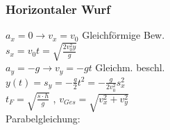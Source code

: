 \begin{multicols}{3}
		\subsubsection{Horizontaler Wurf}
		$a_{x} = 0 \rightarrow{} v_{x} = v_{0}$ Gleichförmige Bew. \\
		$s_{x} = v_{0}t = \sqrt{\frac{2v_{0}^2y}{g}}$ \\
		$a_{y} = -g \rightarrow{} v_{y} = -gt$ Gleichm. beschl.\\
		$y(t) = s_{y} = -\frac{g}{2}t^2 = -\frac{g}{2v_{0}^2}s_{x}^2$ \\
		$t_{F} = \sqrt{\frac{s \cdot h}{g}}$ , $v_{Ges} = \sqrt{v_{x}^2 + v_{y}^2} $ \\
		Parabelgleichung:\\
	\end{multicols}
	
